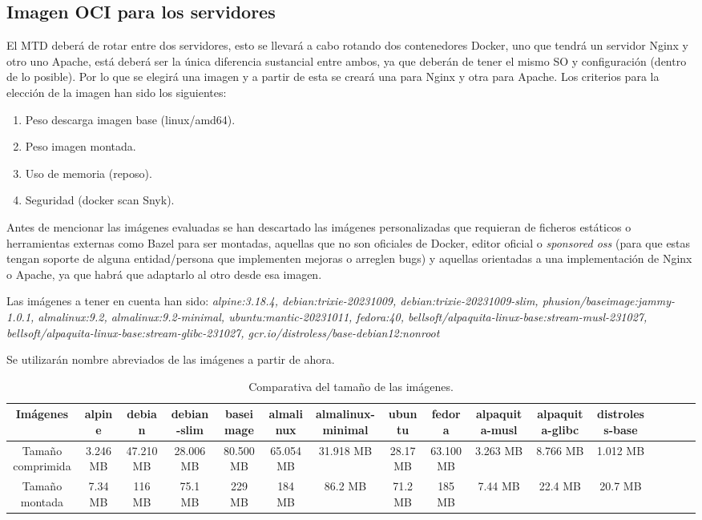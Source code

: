 \subsection{Imagen OCI para los servidores}
El MTD deberá de rotar entre dos servidores, esto se llevará a cabo rotando dos contenedores Docker, uno que tendrá un servidor Nginx y otro uno Apache, está deberá ser la única diferencia sustancial entre ambos, ya que deberán de tener el mismo SO y configuración (dentro de lo posible). Por lo que se elegirá una imagen y a partir de esta se creará una para Nginx y otra para Apache. Los criterios para la elección de la imagen han sido los siguientes:

\begin{enumerate}
    \item Peso descarga imagen base (linux/amd64).
    \item Peso imagen montada.
    \item Uso de memoria (reposo).
    \item Seguridad (docker scan Snyk).
\end{enumerate}

Antes de mencionar las imágenes evaluadas se han descartado las imágenes personalizadas que requieran de ficheros estáticos o herramientas externas como Bazel para ser montadas, aquellas que no son oficiales de Docker, editor oficial o \textit{sponsored oss} (para que estas tengan soporte de alguna entidad/persona que implementen mejoras o arreglen bugs) y aquellas orientadas a una implementación de Nginx o Apache, ya que habrá que adaptarlo al otro desde esa imagen. 

Las imágenes a tener en cuenta han sido: \textit{alpine:3.18.4, debian:trixie-20231009, debian:trixie-20231009-slim, phusion/baseimage:jammy-1.0.1, almalinux:9.2, almalinux:9.2-minimal, ubuntu:mantic-20231011, fedora:40, bellsoft/alpaquita-linux-base:stream-musl-231027, bellsoft/alpaquita-linux-base:stream-glibc-231027, gcr.io/distroless/base-debian12:nonroot}

Se utilizarán nombre abreviados de las imágenes a partir de ahora.

\begin{table}[H]
    \centering
    \begin{adjustbox}{width=\textwidth, totalheight=\textheight, keepaspectratio}
        \begin{tabular}{|c|c|c|c|c|c|c|c|c|c|c|c|c|c|c|c|}
        \hline
         Imágenes & alpine & debian & debian-slim & baseimage & almalinux & almalinux-minimal & ubuntu & fedora & alpaquita-musl & alpaquita-glibc & distroless-base \\
        \hline
        Tamaño comprimida & 3.246 MB & 47.210 MB & 28.006 MB & 80.500 MB & 65.054 MB & 31.918 MB & 28.17 MB & 63.100 MB & 3.263 MB & 8.766 MB & 1.012 MB \\
        \hline
        Tamaño montada & 7.34 MB & 116 MB & 75.1 MB & 229 MB & 184 MB & 86.2 MB & 71.2 MB & 185 MB & 7.44 MB & 22.4 MB & 20.7 MB \\
        \hline
        \end{tabular}
    \end{adjustbox}
    \caption{Comparativa del tamaño de las imágenes.}
\end{table}

